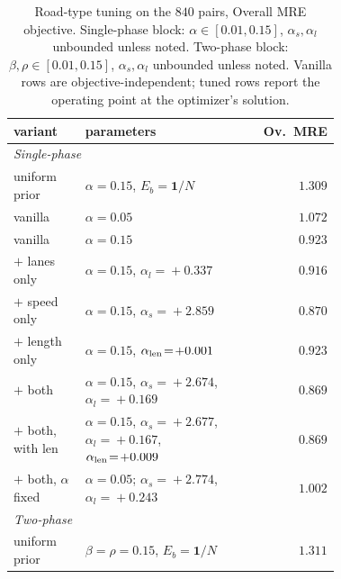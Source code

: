 \begin{table}[H]
\centering
\caption{Road-type tuning on the $840$ pairs, Overall MRE
objective. Single-phase block: $\alpha \in [0.01,0.15]$,
$\alpha_s,\alpha_l$ unbounded unless noted. Two-phase block:
$\beta, \rho \in [0.01,0.15]$, $\alpha_s,\alpha_l$ unbounded
unless noted. Vanilla rows are objective-independent; tuned rows
report the operating point at the optimizer's solution.}
\label{tab:ladder-tuning}
\setlength{\tabcolsep}{3pt}
\renewcommand{\arraystretch}{1.25}
\begin{tabular}{|p{0.22\linewidth}|p{0.50\linewidth}|r|}
\hline
variant & parameters & Ov.\ MRE \\
\hline\hline
\multicolumn{3}{|l|}{\emph{Single-phase}} \\
\hline
uniform prior                        & $\alpha\!=\!0.15$, $E_b\!=\!\mathbf{1}/N$                       & $1.309$ \\
\hline
vanilla                              & $\alpha\!=\!0.05$                                                & $1.072$ \\
\hline
vanilla                              & $\alpha\!=\!0.15$                                                & $0.923$ \\
\hline
$+$ lanes only                       & $\alpha\!=\!0.15$, $\alpha_l\!=\!+0.337$                       & $0.916$ \\
\hline
$+$ speed only                       & $\alpha\!=\!0.15$, $\alpha_s\!=\!+2.859$                       & $0.870$ \\
\hline
$+$ length only                      & $\alpha\!=\!0.15$, $\alpha_{\rm len}\!=\!+0.001$               & $0.923$ \\
\hline
$+$ both                             & $\alpha\!=\!0.15$, $\alpha_s\!=\!+2.674$, $\alpha_l\!=\!+0.169$ & $0.869$ \\
\hline
\makecell[tl]{$+$ both,\\ with len} & $\alpha\!=\!0.15$, $\alpha_s\!=\!+2.677$, $\alpha_l\!=\!+0.167$, $\alpha_{\rm len}\!=\!+0.009$ & $0.869$ \\
\hline
\makecell[tl]{$+$ both,\\ $\alpha$ fixed} & $\alpha\!=\!0.05$; $\alpha_s\!=\!+2.774$, $\alpha_l\!=\!+0.243$ & $1.002$ \\
\hline\hline
\multicolumn{3}{|l|}{\emph{Two-phase}} \\
\hline
uniform prior                        & $\beta\!=\!\rho\!=\!0.15$, $E_b\!=\!\mathbf{1}/N$               & $1.311$ \\

\end{tabular}
\end{table}

